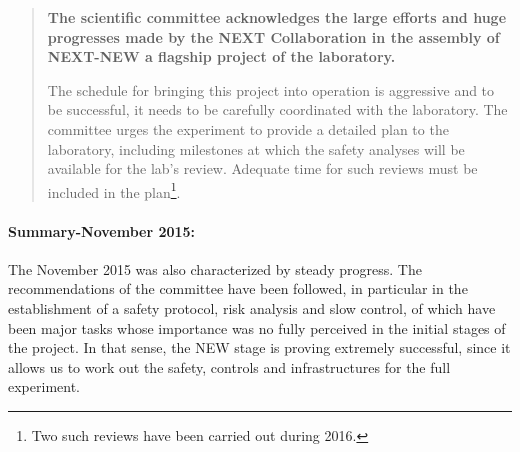\begin{quotation}
{\bf
The scientific committee acknowledges the large efforts and huge progresses made by the NEXT Collaboration in the assembly of NEXT-NEW a flagship project of the laboratory.}

The schedule for bringing this project into operation is aggressive and to be successful, it needs to be carefully coordinated with the laboratory. The committee urges the experiment to provide a detailed plan to the laboratory, including milestones at which the safety analyses will be available for the lab’s review. Adequate time for such reviews must be included in the plan\footnote{Two such reviews have been carried out during 2016.}.

\end{quotation}
\paragraph{Summary-November 2015:} The November 2015 was also characterized by steady progress. The recommendations of the committee have been followed, in particular in the establishment of a safety protocol, risk analysis and slow control, of which have been major tasks whose importance was no fully perceived in the initial stages of the project. In that sense, the NEW stage is proving extremely successful, since it allows us to work out the safety, controls and infrastructures for the full experiment. 


